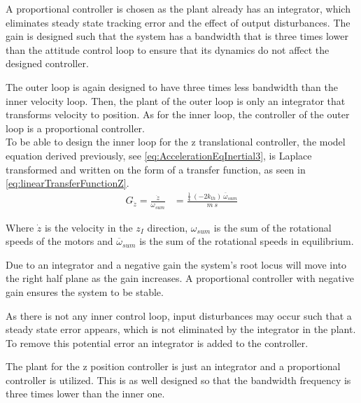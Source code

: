 A proportional controller is chosen as the plant already has an integrator, which eliminates steady state tracking error and the effect of output disturbances. The gain is designed such that the system has a bandwidth that is three times lower than the attitude control loop to ensure that its dynamics do not affect the designed controller. %

The outer loop is again designed to have three times less bandwidth than the inner velocity loop. Then, the plant of the outer loop is only an integrator that transforms velocity to position. As for the inner loop, the controller of the outer loop is a proportional controller. \\

To be able to design the inner loop for the z translational controller, the model equation derived previously, see \autoref{eq:AccelerationEqInertial3}, is Laplace transformed and written on the form of a transfer function, as seen in \autoref{eq:linearTransferFunctionZ}.
%
\begin{align}
G_{\dot{z}}=\frac{\dot{z}}{\omega_{sum}} &= \frac{ \frac{1}{4}\ (-2 k_{th})\ \overline{\omega}_{sum} }{ m\ s }\label{eq:linearTransferFunctionZ}
\end{align}

Where $\dot{z}$ is the velocity in the $z_I$ direction, $\omega_{sum}$ is the sum of the rotational speeds of the motors and $\overline{\omega}_{sum}$ is the sum of the rotational speeds in equilibrium.

Due to an integrator and a negative gain the system's root locus will move into the right half plane as the gain increases. A proportional controller with negative gain ensures the system to be stable. 

As there is not any inner control loop, input disturbances may occur such that a steady state error appears, which is not eliminated by the integrator in the plant. To remove this potential error an integrator is added to the controller. 

The plant for the z position controller is just an integrator and a proportional controller is utilized. This is as well designed so that the bandwidth frequency is three times lower than the inner one.
